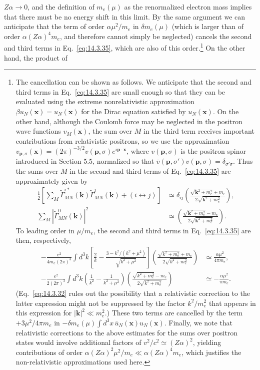 $Z\alpha\to0$, and the definition of $m_e(\mu)$ as the renormalized electron
mass implies that there must be no energy shift in this limit. By the same
argument we can anticipate that the term of order $\alpha\mu^2/m_e$ in
$\delta m_e(\mu)$ (which is larger than of order $\alpha(Z\alpha)^4m_e$, and
therefore cannot simply be neglected) cancels the second and third terms in
Eq.~\eqref{eq:14.3.35}, which are also of this order.\footnote{The cancellation
can be shown as follows. We anticipate that the second and third terms in
Eq.~\eqref{eq:14.3.35} are small enough so that they can be evaluated using
the extreme nonrelativistic approximation $\beta u_N(\mathbf x)=u_N(\mathbf
x)$ for the Dirac equation satisfied by $u_N(\mathbf x)$. On the other hand,
although the Coulomb force may be neglected in the positron wave functions
$v_M(\mathbf x)$, the sum over $M$ in the third term receives important
contributions from relativistic positrons, so we use the approximation
$v_{\mathbf p,\sigma}(\mathbf x)=(2\pi)^{-3/2}v(\mathbf p,\sigma)
e^{i\mathbf p\cdot\mathbf x}$, where $v(\mathbf p,\sigma)$ is the positron
spinor introduced in Section 5.5, normalized so that
$\bar v(\mathbf p,\sigma')v(\mathbf p,\sigma)=\delta_{\sigma'\sigma}$.
Thus the sums over $M$ in the second and third terms of
Eq.~\eqref{eq:14.3.35} are approximately given by
\begin{align*}
\frac12\left[\sum_M\widetilde\Gamma_{MN}^{i*}(\mathbf k)
\widetilde\Gamma_{MN}^{j}(\mathbf k)+(i\leftrightarrow j)\right]
&\simeq\delta_{ij}\left(\frac{\sqrt{\mathbf k^2+m_e^2}+m_e}
{2\sqrt{\mathbf k^2+m_e^2}}\right),\\
\sum_M|\widetilde\Gamma_{MN}^0(\mathbf k)|^2
&\simeq\left(\frac{\sqrt{\mathbf k^2+m_e^2}-m_e}
{2\sqrt{\mathbf k^2+m_e^2}}\right).
\end{align*}
To leading order in $\mu/m_e$, the second and third terms in
Eq.~\eqref{eq:14.3.35} are then, respectively,
\begin{align*}
-\frac{e^2}{4m_e(2\pi)^3}\int d^3k
\left[\frac{2}{k}-\frac{3-k^2/(k^2+\mu^2)}{\sqrt{k^2+\mu^2}}\right]
\left(\frac{\sqrt{k^2+m_e^2}+m_e}{2\sqrt{k^2+m_e^2}}\right)
&\simeq\frac{\alpha\mu^2}{4\pi m_e},\\
-\frac{e^2}{2(2\pi)^3}\int d^3k
\left(\frac1{k^2}-\frac1{k^2+\mu^2}\right)
\left(\frac{\sqrt{k^2+m_e^2}-m_e}{2\sqrt{k^2+m_e^2}}\right)
&\simeq-\frac{\alpha\mu^2}{\pi m_e}.
\end{align*}
(Eq.~\eqref{eq:14.3.32} rules out the possibility that a relativistic
correction to the latter expression might not be suppressed by the factor
$k^2/m_e^2$ that appears in this expression for $|\mathbf k|^2\ll m_e^2$.)
These two terms are cancelled by the term $+3\mu^2/4\pi m_e$ in
$-\delta m_e(\mu)\int d^3x\,\bar u_N(\mathbf x)u_N(\mathbf x)$. Finally, we
note that relativistic corrections to the above estimates for the sums over
positron states would involve additional factors of $v^2/c^2\simeq(Z\alpha)^2$,
yielding contributions of order
$\alpha(Z\alpha)^2\mu^2/m_e\ll\alpha(Z\alpha)^4m_e$, which justifies the
non-relativistic approximations used here.} On the other hand, the product of

